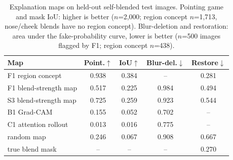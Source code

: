 \begin{table}[t]
\centering
\footnotesize
\setlength{\tabcolsep}{3pt}
\caption{Explanation maps on held-out self-blended test images. Pointing game and mask IoU: higher is better ($n$=2,000; region concept $n$=1,713, nose/cheek blends have no region concept). Blur-deletion and restoration: area under the fake-probability curve, lower is better ($n$=500 images flagged by F1; region concept $n$=438).}
\label{tab:explain}
\begin{tabular}{lcccc}
\toprule
Map & Point.$\uparrow$ & IoU$\uparrow$ & Blur-del.$\downarrow$ & Restore$\downarrow$ \\
\midrule
F1 region concept & 0.938 & 0.384 & -- & 0.281 \\
F1 blend-strength map & 0.517 & 0.225 & 0.984 & 0.494 \\
S3 blend-strength map & 0.725 & 0.259 & 0.923 & 0.544 \\
B1 Grad-CAM & 0.155 & 0.052 & 0.702 & -- \\
C1 attention rollout & 0.013 & 0.016 & 0.775 & -- \\
random map & 0.246 & 0.067 & 0.908 & 0.667 \\
true blend mask & -- & -- & -- & 0.270 \\
\bottomrule
\end{tabular}
\end{table}
